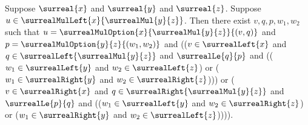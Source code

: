 \begin{proposition}\label{surreal_associative_left_nested_option}
    Suppose $\surreal{x}$ and $\surreal{y}$ and $\surreal{z}$.
    Suppose $u\in\surrealMulLeft{x}{\surrealMul{y}{z}}$.
    Then there exist $v,q,p,w_1,w_2$ such that
        $u=\surrealMulOption{x}{\surrealMul{y}{z}}{(v,q)}$ and
        $p=\surrealMulOption{y}{z}{(w_1,w_2)}$ and
        (($v\in\surrealLeft{x}$ and
            $q\in\surrealLeft{\surrealMul{y}{z}}$ and
            $\surrealLe{q}{p}$ and
            (($w_1\in\surrealLeft{y}$ and
                $w_2\in\surrealLeft{z}$) or
             ($w_1\in\surrealRight{y}$ and
                $w_2\in\surrealRight{z}$))) or
         ($v\in\surrealRight{x}$ and
            $q\in\surrealRight{\surrealMul{y}{z}}$ and
            $\surrealLe{p}{q}$ and
            (($w_1\in\surrealLeft{y}$ and
                $w_2\in\surrealRight{z}$) or
             ($w_1\in\surrealRight{y}$ and
                $w_2\in\surrealLeft{z}$)))).
\end{proposition}
